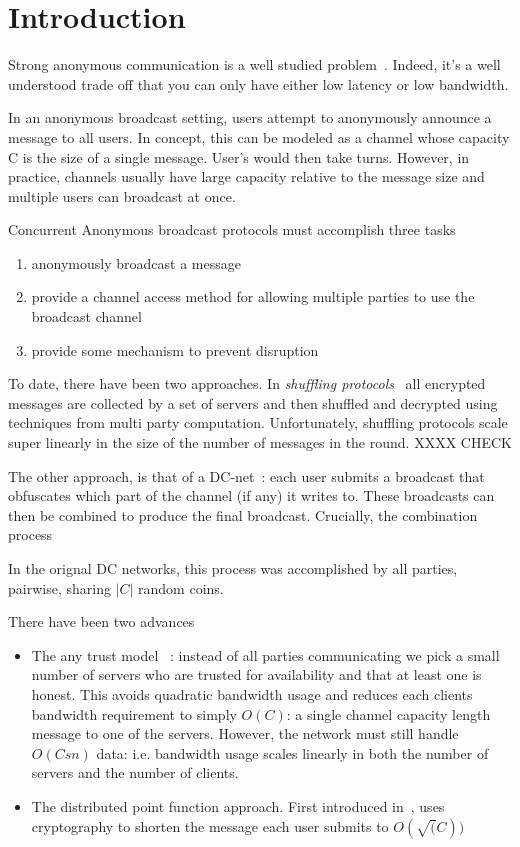 
\section{Introduction}
Strong anonymous communication is a well studied problem~\cite{}. Indeed, it's a well understood trade off that you can only have either low latency or low bandwidth. 

In an anonymous broadcast setting, users attempt to anonymously announce a message to all users. In concept, this can be modeled as a channel whose capacity C is the size of a single message. User's would then take turns. However, in practice, channels usually have large capacity relative to the message size and multiple users can broadcast at once.

Concurrent Anonymous broadcast protocols must accomplish three tasks
\begin{enumerate}
	\item anonymously broadcast a message
	\item provide a channel access method for allowing multiple parties to use the broadcast channel
	\item provide some mechanism to prevent disruption 
\end{enumerate}

To date, there have been two approaches. In \emph{shuffling protocols}~\cite{CCS:LYKGKM19,CCS:AKTZ17} all encrypted messages are collected by a set of servers and then shuffled and decrypted using techniques from multi party computation. Unfortunately, shuffling protocols scale super linearly in the size of the number of messages in the round.  XXXX CHECK 

The other approach, is that of a DC-net~\cite{JC:Chaum88}: each user submits a broadcast that obfuscates which part of the channel (if any) it writes to.  These broadcasts can then be combined to produce the final broadcast. Crucially, the combination process 

In the orignal DC networks, this process was accomplished  by all parties, pairwise, sharing $|C|$ random coins.

There have been two advances 
\begin{itemize}
	\item The any trust model ~\cite{CCS:CorFor10}: instead of all parties communicating we pick a small number of servers who are trusted for availability and that at least one is honest. This avoids quadratic bandwidth usage and reduces each clients bandwidth requirement to simply $O(C)$: a single channel capacity length message to one of the servers. However, the network must still handle $O(Csn)$ data: i.e. bandwidth usage scales linearly in both the number of servers and the number of clients.
	\item The distributed point function approach. First introduced in~\cite{SP:CorBonMaz15}, uses cryptography to shorten the message each user submits to $O(\sqrt(C))$
\end{itemize}
